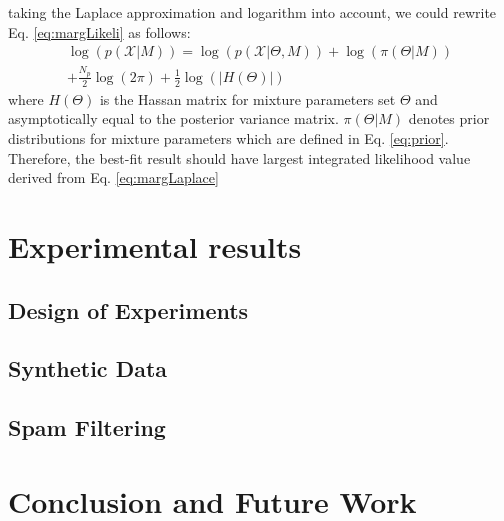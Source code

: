 \documentclass[conference]{IEEEtran}
\begin{document}
taking the Laplace approximation\cite{b4} and logarithm into account, we could rewrite Eq. \eqref{eq:margLikeli} as follows:
\begin{multline}
\log(p(\mathcal{X}|M)) = \log(p(\mathcal{X}|\Theta,M)) + \log(\pi(\Theta|M)) \\
+ \frac{N_p}{2}\log(2\pi) + \frac{1}{2}\log(|H(\Theta)|)\qquad
\label{eq:margLaplace}
\end{multline}
where $H(\Theta)$ is the Hassan matrix for mixture parameters set $\Theta$ and asymptotically equal to the posterior variance matrix. $\pi(\Theta|M)$ denotes prior distributions for mixture parameters which are defined in Eq. \eqref{eq:prior}. Therefore, the best-fit result should have largest integrated likelihood value derived from Eq. \eqref{eq:margLaplace}

\section{Experimental results}
\subsection{Design of Experiments}

\subsection{Synthetic Data}

\subsection{Spam Filtering}

\section{Conclusion and Future Work}
\end{document}
